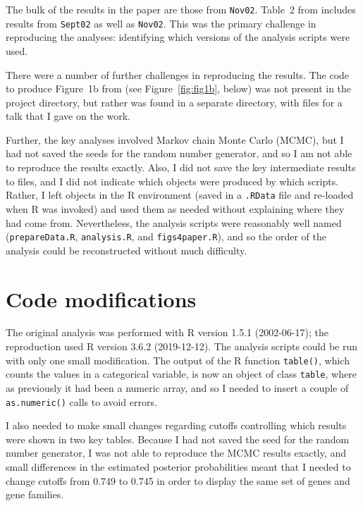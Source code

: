 The bulk of the results in the paper are those from {\tt Nov02}.
Table~2 from \citet{lamichhane2003} includes results from {\tt Sept02}
as well as {\tt Nov02}. This was the primary challenge in reproducing
the analyses: identifying which versions of the analysis
scripts were used.

There were a number of further challenges in reproducing the results.
The code to produce Figure~1b from \citet{lamichhane2003} (see
Figure~\ref{fig:fig1b}, below) was not
present in the project directory, but rather was found in a separate
directory, with files for a talk that I gave on the work.

Further, the key analyses involved Markov chain Monte Carlo (MCMC),
but I had not saved the seeds for the random number generator, and so
I am not able to reproduce the results exactly. Also, I did not save
the key intermediate results to files, and I did not indicate which
objects were produced by which scripts. Rather, I left objects in the
R environment (saved in a {\tt .RData} file and re-loaded when R was
invoked) and used them as needed without explaining where they had
come from. Nevertheless, the analysis scripts were reasonably well
named ({\tt prepareData.R}, {\tt analysis.R},
and {\tt figs4paper.R}), and so the order of the analysis could be
reconstructed without much difficulty.

\section{Code modifications}

The original analysis was performed with R version 1.5.1 (2002-06-17);
the reproduction used R version 3.6.2 (2019-12-12). The analysis
scripts could be run with only one small modification. The output of
the R function {\tt table()}, which counts the values in a
categorical variable, is now an object of class {\tt table}, where as
previously it had been a numeric array, and so
I needed to insert a couple of {\tt as.numeric()} calls to avoid
errors.

I also needed to make small changes regarding cutoffs controlling which results
were shown in two key tables. Because I had not saved the seed for
the random number generator, I was not able to reproduce the MCMC
results exactly, and small differences in the estimated posterior
probabilities meant that I needed to change cutoffs from 0.749 to
0.745 in order to display the same set of genes and gene families.




